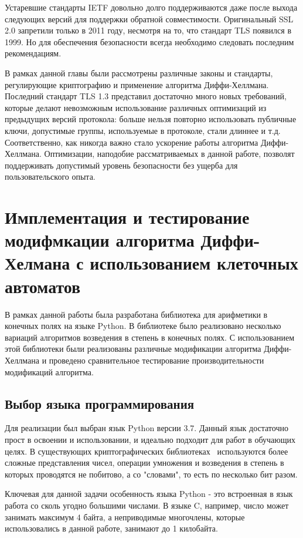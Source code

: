\documentclass[times,specification,annotation]{itmo-student-thesis}
\begin{document}
Устаревшие стандарты IETF довольно долго поддерживаются даже после выхода следующих версий для поддержки обратной совместимости.
Оригинальный SSL 2.0 запретили только в 2011 году, несмотря на то, что стандарт TLS появился в 1999.
Но для обеспечения безопасности всегда необходимо следовать последним рекомендациям.

\chapterconclusion

В рамках данной главы были рассмотрены различные законы и стандарты, регулирующие криптографию и применение алгоритма
Диффи-Хеллмана.
Последний стандарт TLS 1.3 представил достаточно много новых требований, которые делают невозможным использование
различных оптимизаций из предыдущих версий протокола: больше нельзя повторно использовать публичные ключи, допустимые
группы, используемые в протоколе, стали длиннее и т.д.
Соответственно, как никогда важно стало ускорение работы алгоритма Диффи-Хеллмана.
Оптимизации, наподобие рассматриваемых в данной работе, позволят поддерживать допустимый уровень безопасности
без ущерба для пользовательского опыта.

\chapter{Имплементация и тестирование модифмкации алгоритма Диффи-Хелмана с использованием клеточных автоматов}

В рамках данной работы была разработана библиотека для арифметики в конечных полях на языке Python.
В библиотеке было реализовано несколько вариаций алгоритмов возведения в степень в конечных полях.
С использованием этой библиотеки были реализованы различные модификации алгоритма Диффи-Хеллмана и
проведено сравнительное тестирование производительности модификаций алгоритма.

\section{Выбор языка программирования}\label{sec:prog}

Для реализации был выбран язык Python версии 3.7.
Данный язык достаточно прост в освоении и использовании, и идеально подходит для работ в обучающих целях.
В существующих криптографических библиотеках~\cite{openssl} используются более сложные представления чисел,
операции умножения и возведения в степень в которых проводятся не побитово, а со "словами", то есть по несколько бит разом.

Ключевая для данной задачи особенность языка Python - это встроенная в язык работа со сколь угодно большими числами.
В языке C, например, число может занимать максимум 4 байта, а неприводимые многочлены, которые использовались
в данной работе, занимают до 1 килобайта.
\end{document}
